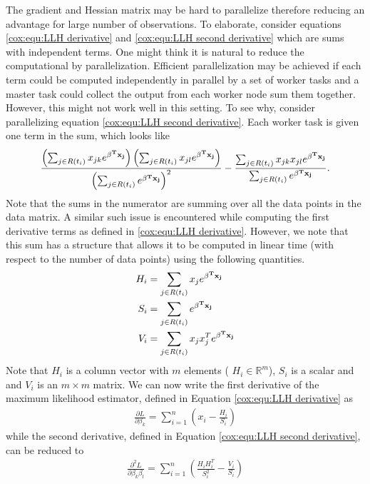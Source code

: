 The gradient and Hessian matrix may be hard to parallelize therefore reducing an advantage for large number of observations. To elaborate, consider equations  \ref{cox:equ:LLH derivative} and \ref{cox:equ:LLH second derivative} which are sums with independent terms. One might think it is natural to reduce the computational by parallelization. Efficient parallelization may be achieved if each term could be computed independently in parallel by a set of worker tasks and a master task could collect the output from each worker node sum them together. However, this might not work well in this setting. To see why, consider parallelizing equation \ref{cox:equ:LLH second derivative}.  Each worker task is given one term in the sum, which looks like
\begin{equation}
 \frac{\left(  \sum_{j \in R(t_i)} x_{jk} e^{\bold{\beta^T x _j} } \right) \left(  \sum_{j \in R(t_i)} x_{jl} e^{\bold{\beta^T x _j} } \right)}{\left( \sum_{j \in R(t_i)} e^{\bold{\beta^T x_j} } \right)^2 }   -  \frac{  \sum_{j \in R(t_i)} x_{jk}x_{jl} e^{\bold{\beta^T x_j} } }{\sum_{j \in R(t_i)} e^{\bold{\beta^T x_j} } }.  
\end{equation}
Note that the sums in the numerator are summing over all the data points in the data matrix. A similar such issue is encountered while computing the first derivative terms as defined in \ref{cox:equ:LLH derivative}. However, we note that this sum has a structure that allows it to be computed in linear time (with respect to the number of data points) using the following quantities.
\begin{align}
H_{i} &=   \sum_{j \in R(t_i)} x_{j} e^{\bold{\beta^T x_j}}\\
S_{i}&=   \sum_{j \in R(t_i)} e^{\bold{\beta^T x_j}} \\
V_{i}&=   \sum_{j \in R(t_i)} x_{j}x_{j}^T e^{\bold{\beta^T x_j} }
\end{align}
Note that $H_{i}$ is a column vector with $m$ elements ( $H_{i}\in \mathbb{R}^m$), $S_{i}$ is a scalar and and $V_{i}$ is an $m \times m$ matrix.
We can now write the first derivative of the maximum likelihood estimator, defined in Equation \ref{cox:equ:LLH derivative} as
\begin{align}
\frac{\partial L}{\partial \beta_k} = \sum_{i = 1}^n \left( x_{i} - \frac{H_{i} }{ S_{i}}  \right)
\end{align}
while the second derivative, defined in Equation \ref{cox:equ:LLH second derivative}, can be reduced to
\begin{align}
\frac{\partial^2 L}{\partial \beta_k \beta_l} = \sum_{i = 1}^n \left( \frac{H_{i}H_{i}^T }{ S_{i}^2 } -  \frac{V_{i}}{ S_{i} } \right) 
\end{align}
